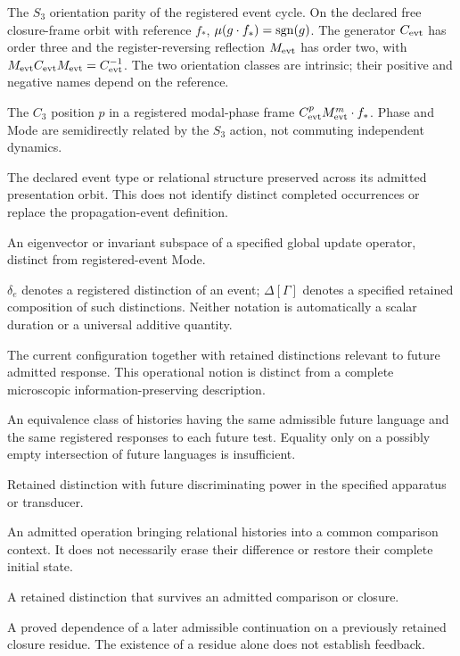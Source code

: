 \begin{description}[style=nextline,leftmargin=1.5em,font=\normalfont\bfseries]
\item[Mode]
The $S_3$ orientation parity of the registered event cycle. On the declared free closure-frame orbit with reference $f_*$, $\mu(g\cdot f_*)=\operatorname{sgn}(g)$. The generator $C_{\mathrm{evt}}$ has order three and the register-reversing reflection $M_{\mathrm{evt}}$ has order two, with $M_{\mathrm{evt}}C_{\mathrm{evt}}M_{\mathrm{evt}}=C_{\mathrm{evt}}^{-1}$. The two orientation classes are intrinsic; their positive and negative names depend on the reference.
\item[Registered event phase]
The $C_3$ position $p$ in a registered modal-phase frame $C_{\mathrm{evt}}^pM_{\mathrm{evt}}^m\cdot f_*$. Phase and Mode are semidirectly related by the $S_3$ action, not commuting independent dynamics.
\item[Event-presentation invariant]
The declared event type or relational structure preserved across its admitted presentation orbit. This does not identify distinct completed occurrences or replace the propagation-event definition.
\item[Collective eigenmode]
An eigenvector or invariant subspace of a specified global update operator, distinct from registered-event Mode.
\item[Delta]
$\delta_e$ denotes a registered distinction of an event; $\Delta[\Gamma]$ denotes a specified retained composition of such distinctions. Neither notation is automatically a scalar duration or a universal additive quantity.
\item[Complete operational state]
The current configuration together with retained distinctions relevant to future admitted response. This operational notion is distinct from a complete microscopic information-preserving description.
\item[Predictive history class]
An equivalence class of histories having the same admissible future language and the same registered responses to each future test. Equality only on a possibly empty intersection of future languages is insufficient.
\item[Memory]
Retained distinction with future discriminating power in the specified apparatus or transducer.
\item[Closure]
An admitted operation bringing relational histories into a common comparison context. It does not necessarily erase their difference or restore their complete initial state.
\item[Closure residue]
A retained distinction that survives an admitted comparison or closure.
\item[Closure feedback]
A proved dependence of a later admissible continuation on a previously retained closure residue. The existence of a residue alone does not establish feedback.

\end{description}
